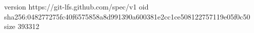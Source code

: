 version https://git-lfs.github.com/spec/v1
oid sha256:048277275fc40f6575858a8d991390a600381e2cc1ce508122757119e05f0c50
size 393312
